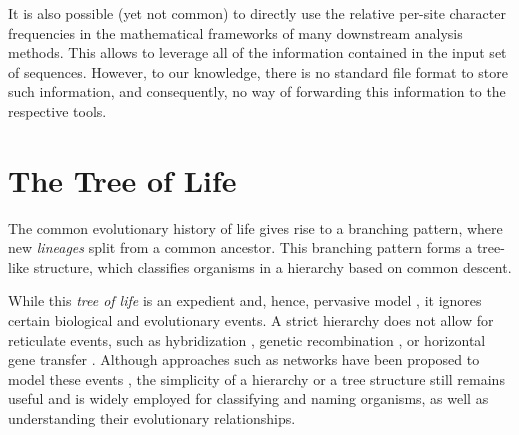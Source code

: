 It is also possible (yet not common) to directly use the relative per-site character frequencies
in the mathematical frameworks of many downstream analysis methods.
This allows to leverage all of the information contained in the input set of sequences.
However, to our knowledge, there is no standard file format to store such information,
and consequently, no way of forwarding this information to the respective tools.


\section{The Tree of Life}
\label{ch:Foundations:sec:TreeOfLife}

The common evolutionary history of life gives rise to a branching pattern,
where new \emph{lineages} split from a common ancestor.
This branching pattern forms a tree-like structure,
which classifies organisms in a hierarchy based on common descent.

While this \emph{tree of life} is an expedient and, hence, pervasive model \cite{Mindell2013},
it ignores certain biological and evolutionary events.
A strict hierarchy does not allow for reticulate events,
such as hybridization \cite{Maddison1997a}, genetic recombination \cite{Hein1993},
or horizontal gene transfer \cite{Ochman2000,DunningHotopp2011,Robinson2013}.
Although approaches such as networks have been proposed to model these events \cite{Huson2011a},
the simplicity of a hierarchy or a tree structure still remains useful and
is widely employed for classifying and naming organisms, as well as understanding their evolutionary relationships.





